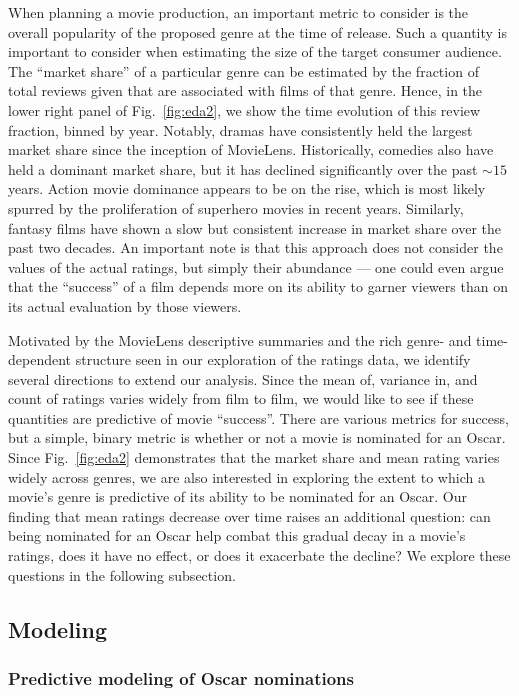 \documentclass[dvipsnames]{article}
\begin{document}
When planning a movie production, an important metric to consider is the overall popularity of the proposed genre at the time of release. Such a quantity is important to consider when estimating the size of the target consumer audience. The ``market share'' of a particular genre can be estimated by the fraction of total reviews given that are associated with films of that genre. Hence, in the lower right panel of Fig.~\ref{fig:eda2}, we show the time evolution of this review fraction, binned by year. Notably, dramas have consistently held the largest market share since the inception of MovieLens. Historically, comedies also have held a dominant market share, but it has declined significantly over the past ${\sim}15$ years. Action movie dominance appears to be on the rise, which is most likely spurred by the proliferation of superhero movies in recent years. Similarly, fantasy films have shown a slow but consistent increase in market share over the past two decades. An important note is that this approach does not consider the values of the actual ratings, but simply their abundance --- one could even argue that the ``success'' of a film depends more on its ability to garner viewers than on its actual evaluation by those viewers.

Motivated by the MovieLens descriptive summaries and the rich genre- and time-dependent structure seen in our exploration of the ratings data, we identify several directions to extend our analysis. Since the mean of, variance in, and count of ratings varies widely from film to film, we would like to see if these quantities are predictive of movie ``success''. There are various metrics for success, but a simple, binary metric is whether or not a movie is nominated for an Oscar. Since Fig.~\ref{fig:eda2} demonstrates that the market share and mean rating varies widely across genres, we are also interested in exploring the extent to which a movie's genre is predictive of its ability to be nominated for an Oscar. Our finding that mean ratings decrease over time raises an additional question: can being nominated for an Oscar help combat this gradual decay in a movie's ratings, does it have no effect, or does it exacerbate the decline? We explore these questions in the following subsection.

\subsection{Modeling}

\subsubsection{Predictive modeling of Oscar nominations}
\end{document}
